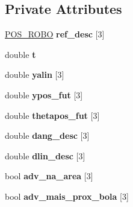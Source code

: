 \subsection*{Private Attributes}
\begin{DoxyCompactItemize}
\item 
\hyperlink{structPOS__ROBO}{P\+O\+S\+\_\+\+R\+O\+BO} {\bfseries ref\+\_\+desc} \mbox{[}3\mbox{]}\hypertarget{classStrategy_adecbd5166b74ada1eed78a204f64392b}{}\label{classStrategy_adecbd5166b74ada1eed78a204f64392b}

\item 
double {\bfseries t}\hypertarget{classStrategy_ae9e4e90bef09a8e4b5e5a7114ff4498d}{}\label{classStrategy_ae9e4e90bef09a8e4b5e5a7114ff4498d}

\item 
double {\bfseries yalin} \mbox{[}3\mbox{]}\hypertarget{classStrategy_ada2cc0d9002cbba9c8836fd275c70faf}{}\label{classStrategy_ada2cc0d9002cbba9c8836fd275c70faf}

\item 
double {\bfseries ypos\+\_\+fut} \mbox{[}3\mbox{]}\hypertarget{classStrategy_a3b7dca422268f29463dc115e2eb0069c}{}\label{classStrategy_a3b7dca422268f29463dc115e2eb0069c}

\item 
double {\bfseries thetapos\+\_\+fut} \mbox{[}3\mbox{]}\hypertarget{classStrategy_a7bc90892981417601aed90f6d5265a6d}{}\label{classStrategy_a7bc90892981417601aed90f6d5265a6d}

\item 
double {\bfseries dang\+\_\+desc} \mbox{[}3\mbox{]}\hypertarget{classStrategy_a6c93a66ea0d4f89c481ad61600340bd2}{}\label{classStrategy_a6c93a66ea0d4f89c481ad61600340bd2}

\item 
double {\bfseries dlin\+\_\+desc} \mbox{[}3\mbox{]}\hypertarget{classStrategy_a4bf99210a25f6be66b3e7bf7aeac8c12}{}\label{classStrategy_a4bf99210a25f6be66b3e7bf7aeac8c12}

\item 
bool {\bfseries adv\+\_\+na\+\_\+area} \mbox{[}3\mbox{]}\hypertarget{classStrategy_a09c8f562616ae2f5a16cbefebf89df76}{}\label{classStrategy_a09c8f562616ae2f5a16cbefebf89df76}

\item 
bool {\bfseries adv\+\_\+mais\+\_\+prox\+\_\+bola} \mbox{[}3\mbox{]}\hypertarget{classStrategy_aad663c774087c6db492c8815cc48e3a3}{}\label{classStrategy_aad663c774087c6db492c8815cc48e3a3}


\end{DoxyCompactItemize}
